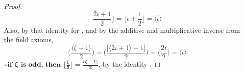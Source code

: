 \documentclass[preview]{standalone}
\begin{document}
\begin{proof}
\begin{equation*}
            \frac{2 \iota + 1}{2}
        \bigg \rfloor 
            = 
        \bigg \lfloor
            \iota + \frac{1}{2}
        \bigg \rfloor 
            = 
        \Big \langle \iota \Big \rangle
    \end{equation*}
    Also, by that identity for \bm{$\zeta$},
    and by the additive and multiplicative inverse from the field axioms,
    \begin{equation*}
        \Bigg( \frac{\big \langle \zeta - 1 \big \rangle }{2} \Bigg)
            = 
        \Bigg( \frac{\big[ \big \langle 2 \iota + 1 \big \rangle - 1 \big]}{2} \Bigg)
            = 
        \Bigg( \frac{2 \iota}{2} \Bigg)
            = 
        \Big \langle \iota \Big \rangle
    \end{equation*} 
    $\therefore \textbf{if } \bm{\zeta} \textbf{ is odd, then } 
    \bm{
        \Big \lfloor \frac{\zeta}{2} \Big \rfloor 
            = 
        \frac{ \langle \zeta - 1 \rangle }{2}
    }$, 
    by the identity \bm{$\iota$}.
\color{lightgray} \end{proof}
\end{document}
